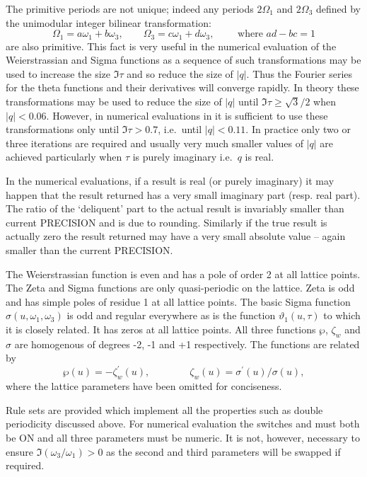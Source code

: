 The primitive periods are not unique;
indeed any periods $2\Omega_1$ and $2\Omega_3$ defined by the unimodular integer bilinear transformation:
\[\Omega_1 = a\omega_1 + b\omega_3,\qquad\Omega_3 = c\omega_1 + d\omega_3,\qquad\text{ where }ad-bc = 1\]
are also primitive. This fact is very useful in the numerical evaluation of the Weierstrassian and Sigma
functions as a sequence of such transformations may be used to increase the size $\Im \tau$ and so reduce
the size of $|q|$. Thus the Fourier series for the theta functions and their derivatives will converge rapidly.
In theory these transformations may be used to reduce the size of $|q|$ until $\Im \tau \geq \sqrt 3/2$ when
$|q|<0.06$. However, in numerical evaluations in \REDUCE it is sufficient to use these transformations only until
$\Im \tau > 0.7$, i.e.~until $|q| < 0.11$. In practice only two or three iterations are required
and usually very much smaller values of $|q|$ are achieved particularly when $\tau$ is purely imaginary i.e.~$q$ is real.

In the numerical evaluations, if a result is real (or purely imaginary) it may
happen that the result returned has a very small imaginary part
(resp. real part). The ratio of the `deliquent' part to the actual result is
invariably smaller than current PRECISION and is due to rounding. Similarly if
the true result is actually zero the result returned may have a very small
absolute value -- again smaller than the current PRECISION.

The Weierstrassian function is even and has a pole of order 2 at all lattice points.
The Zeta and Sigma functions are only quasi-periodic on the lattice. Zeta is odd and has simple poles of residue
1 at all lattice points. The basic Sigma function $\sigma(u,\omega_1,\omega_3)$ is odd and regular everywhere as is
the function $\vartheta_1(u,\tau)$ to which it is closely related. It has zeros at all lattice points. All three functions
$\wp$, $\zeta_w$ and $\sigma$ are homogenous of degrees -2, -1 and +1 respectively. The functions are related by
\[ \wp(u) = -\zeta_w^\prime(u),\qquad\qquad \zeta_w(u) = \sigma^\prime(u)/\sigma(u),\]
where the lattice parameters have been omitted for conciseness.

Rule sets are provided which implement all the properties such as double periodicity discussed above. For numerical evaluation
the switches  and  must both be ON and all three parameters must be numeric. It is not, however,
necessary to ensure $\Im(\omega_3/\omega_1) >0$ as the second and third parameters will be swapped if required.

